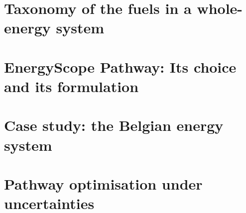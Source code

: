 \documentclass[a4paper,twoside,10pt,final]{memoir} %
\begin{document}

{\footnotesize}





%
\begin{appendices}

\chapter{Taxonomy of the fuels in a whole-energy system}
\label{app:Taxonomy}


\chapter{EnergyScope Pathway: Its choice and its formulation}
\label{app:EnergyScope}


\chapter{Case study: the Belgian energy system}
\label{app:case_study}


\chapter{Pathway optimisation under uncertainties}
\label{app:results_UQ}




\end{appendices}
\end{document}

